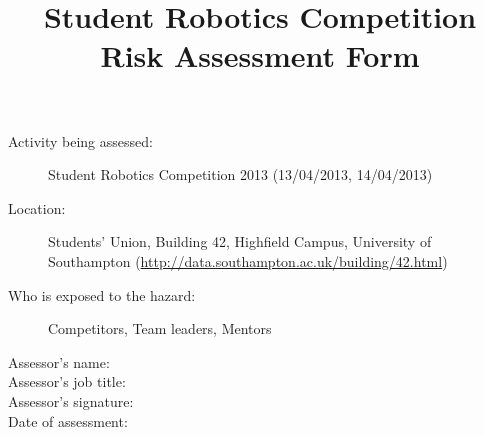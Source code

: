 \documentclass[12pt,a4paper]{scrartcl}
\title{Student Robotics Competition Risk Assessment Form}
\begin{document}
\maketitle

\begin{description}
\item[Activity being assessed:] Student Robotics Competition 2013 (13/04/2013, 14/04/2013)
\item[Location:] Students' Union, Building 42, Highfield Campus, University of Southampton (\url{http://data.southampton.ac.uk/building/42.html})
\item[Who is exposed to the hazard:] Competitors, Team leaders, Mentors
\end{description}

\begin{description}
\item[Assessor's name:]
\item[Assessor's job title:]
\item[Assessor's signature:]
\item[Date of assessment:]
\end{description}
\clearpage

\newcommand{\risk}[3]{
 #1 & #2 & #3 \\
}
\end{document}
